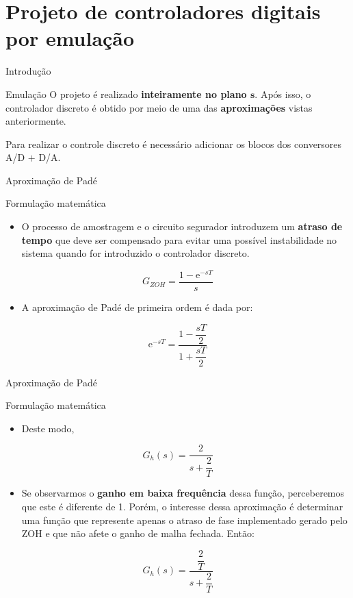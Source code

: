 \section{Projeto de controladores digitais por emulação}

\begin{frame}{Introdução}
\begin{block}{Emulação}
	O projeto é realizado \textbf{inteiramente no plano $ \bm{s} $}. Após isso, o controlador discreto é obtido por meio de uma das \textbf{aproximações} vistas anteriormente.
	
	Para realizar o controle discreto é necessário adicionar os blocos dos conversores A/D $ + $ D/A.
\end{block}

\vspace{0.5cm}

\centering

\scalebox{0.6}{}
\end{frame}


\begin{frame}{Aproximação de Padé}
\begin{block}{Formulação matemática}
\begin{itemize}
    \item O processo de amostragem e o circuito segurador introduzem um \textbf{atraso de tempo} que deve ser compensado para evitar uma possível instabilidade no sistema quando for introduzido o controlador discreto.
\end{itemize}
$$G_{ZOH} = \dfrac{1 - \text{e}^{-sT}}{s}$$
\begin{itemize}
    \item A aproximação de Padé de primeira ordem é dada por:
\end{itemize}
$$\text{e}^{-sT} = \dfrac{1 - \dfrac{sT}{2}}{1+\dfrac{sT}{2}}$$
\end{block}
\end{frame}

\begin{frame}{Aproximação de Padé}
\begin{block}{Formulação matemática}
\begin{itemize}
    \item Deste modo,
\end{itemize}
$$G_h(s)=\dfrac{2}{s+\dfrac{2}{T}}$$
\begin{itemize}
    \item Se observarmos o \textbf{ganho em baixa frequência} dessa função, perceberemos que este é diferente de 1. Porém, o interesse dessa aproximação é determinar uma função que represente apenas o atraso de fase implementado gerado pelo ZOH e que não afete o ganho de malha fechada. Então:
\end{itemize}
$$\boxed{G_h(s)=\dfrac{\dfrac{2}{T}}{s+\dfrac{2}{T}}}$$
\end{block}
\end{frame}

